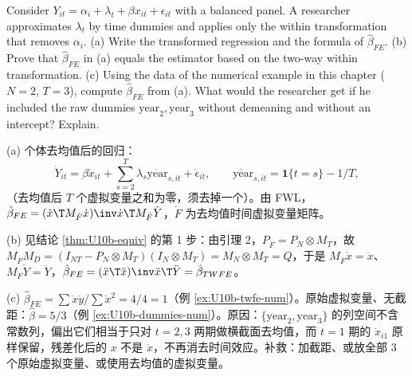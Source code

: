 \begin{prac}\label{pr:U10b-onewaydum}
Consider $Y_{it}=\alpha_i+\lambda_t+\beta x_{it}+\epsilon_{it}$ with a balanced panel. A researcher approximates $\lambda_t$ by time dummies and applies only the within transformation that removes $\alpha_i$. (a) Write the transformed regression and the formula of $\hat\beta_{FE}$. (b) Prove that $\hat\beta_{FE}$ in (a) equals the estimator based on the two-way within transformation. (c) Using the data of the numerical example in this chapter ($N=2$, $T=3$), compute $\hat\beta_{FE}$ from (a). What would the researcher get if he included the raw dummies $\mathrm{year}_2,\mathrm{year}_3$ without demeaning and without an intercept? Explain.

\answer (a) 个体去均值后的回归：
\[
\dot Y_{it}=\beta\dot x_{it}+\sum_{s=2}^T\lambda_s\dot{\mathrm{year}}_{s,it}+\dot\epsilon_{it},\qquad \dot{\mathrm{year}}_{s,it}=\mathbf 1\{t=s\}-1/T,
\]
（去均值后 $T$ 个虚拟变量之和为零，须去掉一个）。由 FWL，$\hat\beta_{FE}=(\dot x\T M_{\dot F}\dot x)\inv\dot x\T M_{\dot F}\dot Y$，$\dot F$ 为去均值时间虚拟变量矩阵。

(b) 见结论 \ref{thm:U10b-equiv} 的第 1 步：由引理 2，$P_{\dot F}=P_N\otimes M_T$，故 $M_{\dot F}M_D=(I_{NT}-P_N\otimes M_T)(I_N\otimes M_T)=M_N\otimes M_T=Q$，于是 $M_{\dot F}\dot x=\ddot x$、$M_{\dot F}\dot Y=\ddot Y$，$\hat\beta_{FE}=(\ddot x\T\ddot x)\inv\ddot x\T\ddot Y=\hat\beta_{TWFE}$。

(c) $\hat\beta_{FE}=\sum\ddot x\ddot y/\sum\ddot x^2=4/4=1$（例 \ref{ex:U10b-twfe-num}）。原始虚拟变量、无截距：$\hat\beta=5/3$（例 \ref{ex:U10b-dummies-num}）。原因：$\{\mathrm{year}_2,\mathrm{year}_3\}$ 的列空间不含常数列，偏出它们相当于只对 $t=2,3$ 两期做横截面去均值，而 $t=1$ 期的 $\dot x_{i1}$ 原样保留，残差化后的 $x$ 不是 $\ddot x$，不再消去时间效应。补救：加截距、或放全部 3 个原始虚拟变量、或使用去均值的虚拟变量。
\end{prac}

